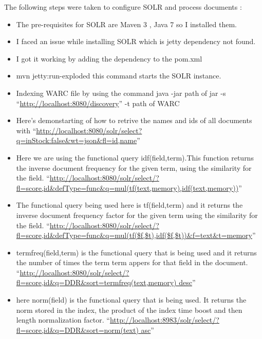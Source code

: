 The following steps were taken to configure SOLR and process documents :
\begin{itemize}
	\item The pre-requisites for SOLR are Maven 3 , Java 7 so I installed them.
	\item I faced an issue while installing SOLR which is jetty dependency not found.
	\item I got it working by adding the dependency to the pom.xml
	\item mvn jetty:run-exploded this command starts the SOLR instance.
	\item Indexing WARC file by using the command java -jar path of jar -s ``\url{http://localhost:8080/discovery}'' -t path of WARC
	\item Here's demonstarting of how to retrive the names and ids of all documents with ``\url{http://localhost:8080/solr/select?q=inStock:false&wt=json&fl=id,name}''
	\item Here we are using the functional query idf(field,term).This function returns the inverse document frequency for the given term, using the similarity for the field. ``\url{http://localhost:8080/solr/select/?fl=score,id&defType=func&q=mul(tf(text,memory),idf(text,memory))}''
	
	\item The functional query being used here is tf(field,term) and it returns the inverse document frequency factor for the given term using the similarity for the field. ``\url{http://localhost:8080/solr/select/?fl=score,id&defType=func&q=mul(tf($f,$t),idf($f,$t))&f=text&t=memory}''
	
	\item termfreq(field,term) is the functional query that is being used and it returns the number of times the term term appers for that field in the document. ``\url{http://localhost:8080/solr/select/?fl=score,id&q=DDR&sort=termfreq(text,memory) desc}''  
	
	\item here norm(field) is the functional query that is being used. It returns the norm stored in the index, the product of the index time boost and then length normalization factor. ``\url{http://localhost:8983/solr/select/?fl=score,id&q=DDR&sort=norm(text) asc}''    			  						        
\end{itemize}
\newpage


